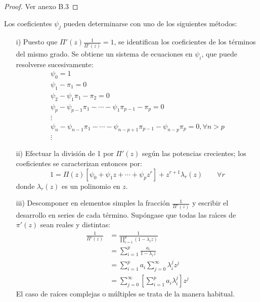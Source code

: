\begin{proof}
 Ver anexo B.3
\end{proof}

\begin{observacion}
Los coeficientes $\psi_{j} $ pueden determinarse con uno de los siguientes m\'{e}todos: 

\begin{enumerate}
\item[i)] Puesto que $\Pi'(z)\frac 1{\Pi'(z)}=1$, se identifican los coeficientes de los t\'{e}rminos del mismo grado. Se obtiene un sistema de ecuaciones en $\psi_{i} $, que puede resolverse sucesivamente:
\begin{gather*}
 \psi_{0} =1 \\ 
 \psi_{1} -\pi_{1} =0 \\ 
 \psi_{2} -\psi_{1} \pi_{1} -\pi_{2} =0 \\ 
 \psi_{p} -\psi_{p-1} \pi_{1} -\cdots-\psi_{1} \pi_{p-1} -\pi_{p} =0 \\ 
 \vdots \\ 
 \psi_{n} -\psi_{n-1} \pi_{1}-\cdots-\psi_{n-p+1} \pi_{p-1} -\psi_{n-p} \pi_{p} =0, \forall n>p \\ 
 \vdots 
\end{gather*}

\item[ii)] Efectuar la divisi\'{o}n de 1 por $\Pi'(z)$ seg\'{u}n las potencias crecientes; los coeficientes se caracterizan entonces por:
\[
 1=\Pi(z)[\psi_0+\psi_1z+\cdots+ \psi_pz^r]+z^{r+1}\lambda_r(z)\qquad \forall r
\]
donde $\lambda_{r}( z )$ es un polinomio en $z$. 

\item[iii)] Descomponer en elementos simples la fracci\'{o}n $\frac{1}{\Pi'( z )}$ y escribir el desarrollo en series de cada t\'{e}rmino. Sup\'{o}ngase que todas las ra\'{\i}ces de $\pi'( z )$ sean reales y distintas:
\begin{align*}
\frac{1}{\Pi'\left( z \right)}
	&=\frac{1}{\prod_{i=1}^{p} ( {1-\lambda_{i} z} )}\\
	&=\sum_{i=1}^p {\frac{a_{i}}{1-\lambda_{i} z}}\\
	&=\sum_{i=1}^p {a_{i} } \sum_{j=0}^\infty {\lambda_{i}^{j} } z^{j}\\
	&=\sum_{j=0}^\infty {\left[ {\sum_{i=1}^p {a_{i} \lambda _{i}^{j} } } \right]} z^{j}
\end{align*}
El caso de ra\'{i}ces complejas o m\'{u}ltiples se trata de la manera habitual.
\end{enumerate}
\end{observacion}


